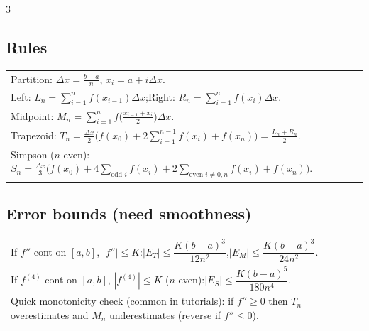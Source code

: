 \documentclass[10pt]{article}
\begin{document}
\begin{multicols}{3}
\subsection*{Rules}
\vspace{-1pt}
\begin{tabular}{@{}p{}@{}}
Partition: $\Delta x=\frac{b-a}{n}$, $x_i=a+i\Delta x$.\\
Left: $L_n=\sum_{i=1}^n f(x_{i-1})\Delta x$;\quad Right: $R_n=\sum_{i=1}^n f(x_i)\Delta x$.\\
Midpoint: $M_n=\sum_{i=1}^n f\big(\frac{x_{i-1}+x_i}{2}\big)\Delta x$.\\
Trapezoid: $T_n=\frac{\Delta x}{2}\big(f(x_0)+2\sum_{i=1}^{n-1}f(x_i)+f(x_n)\big)=\frac{L_n+R_n}{2}$.\\
Simpson (\(n\) even): $S_n=\frac{\Delta x}{3}\big(f(x_0)+4\sum_{\text{odd }i}f(x_i)+2\sum_{\text{even }i\neq 0,n}f(x_i)+f(x_n)\big)$.\\
\end{tabular}

\subsection*{Error bounds (need smoothness)}
\vspace{-1pt}
\begin{tabular}{@{}p{}@{}}
If $f''$ cont on $[a,b]$, $|f''|\le K$:\quad $|E_T|\le\dfrac{K(b-a)^3}{12n^2}$,\quad $|E_M|\le\dfrac{K(b-a)^3}{24n^2}$.\\
If $f^{(4)}$ cont on $[a,b]$, $|f^{(4)}|\le K$ (\(n\) even):\quad $|E_S|\le\dfrac{K(b-a)^5}{180n^4}$.\\
Quick monotonicity check (common in tutorials): if $f''\ge 0$ then $T_n$ overestimates and $M_n$ underestimates (reverse if $f''\le 0$).\\
\end{tabular}

\end{multicols}
\end{document}

